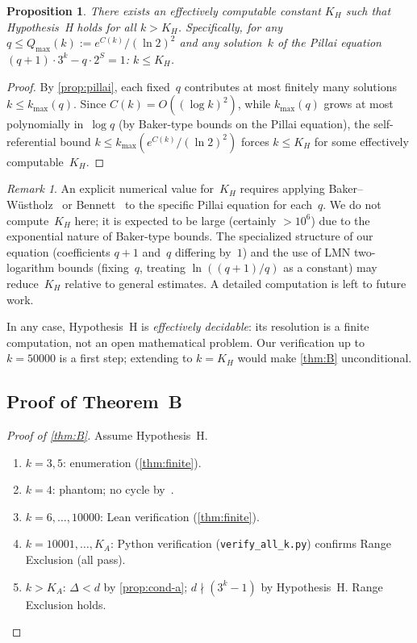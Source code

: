 \documentclass[11pt, a4paper]{amsart}
\theoremstyle{plain}
\newtheorem{proposition}[theorem]{Proposition}
\theoremstyle{definition}
\theoremstyle{remark}
\newtheorem{remark}[theorem]{Remark}
\begin{document}
\begin{proposition}\label{prop:KH}
  There exists an effectively computable constant $K_H$ such
  that Hypothesis~H holds for all $k > K_H$.
  Specifically, for any $q \leq Q_{\max}(k) :=
  e^{C(k)}/(\ln 2)^2$ and any solution~$k$ of the Pillai
  equation $(q+1) \cdot 3^k - q \cdot 2^S = 1$:
  $k \leq K_H$.
\end{proposition}

\begin{proof}
  By \cref{prop:pillai}, each fixed~$q$ contributes at most
  finitely many solutions $k \leq k_{\max}(q)$.
  Since $C(k) = O((\log k)^2)$, while $k_{\max}(q)$ grows
  at most polynomially in~$\log q$
  (by Baker-type bounds on the Pillai equation), the
  self-referential bound $k \leq k_{\max}(e^{C(k)}/(\ln 2)^2)$
  forces $k \leq K_H$ for some effectively computable~$K_H$.
\end{proof}

\begin{remark}\label{rem:KH-computation}
  An explicit numerical value for~$K_H$ requires
  applying Baker--W\"ustholz~\cite{BakerWustholz1993} or
  Bennett~\cite{Bennett2003} to the specific Pillai
  equation for each~$q$.  We do not compute~$K_H$ here;
  it is expected to be large (certainly $> 10^6$) due to
  the exponential nature of Baker-type bounds.
  The specialized structure of our equation
  (coefficients $q+1$ and~$q$ differing by~$1$)
  and the use of LMN two-logarithm bounds
  (fixing~$q$, treating $\ln((q{+}1)/q)$ as a constant)
  may reduce~$K_H$ relative to general estimates.
  A detailed computation is left to future work.

  In any case, Hypothesis~H is \emph{effectively decidable}:
  its resolution is a finite computation, not an open
  mathematical problem.  Our verification up to $k = 50000$
  is a first step; extending to $k = K_H$ would make
  \cref{thm:B} unconditional.
\end{remark}

\subsection{Proof of Theorem~B}\label{ssec:proof-B}

\begin{proof}[Proof of \cref{thm:B}]
  Assume Hypothesis~H.
  \begin{enumerate}[label=(\roman*)]
    \item $k = 3, 5$: enumeration (\cref{thm:finite}).
    \item $k = 4$: phantom; no cycle by~\cite{SimonsDeWeger2005}.
    \item $k = 6, \ldots, 10000$: Lean verification
          (\cref{thm:finite}).
    \item $k = 10001, \ldots, K_A$: Python verification
          (\texttt{verify\_all\_k.py}) confirms Range
          Exclusion (all pass).
    \item $k > K_A$: $\Delta < d$ by \cref{prop:cond-a};
          $d \nmid (3^k-1)$ by Hypothesis~H.
          Range Exclusion holds. \qedhere
  \end{enumerate}
\end{proof}
\end{document}
